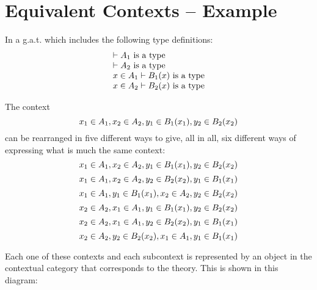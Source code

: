 \documentclass[10pt,a4paper]{scrartcl}
\begin{document}
\section{Equivalent Contexts -- Example}

In a g.a.t. \gat which includes the following type definitions:
\begin{displaymath}
\begin{array}{l}
\vdash A_1\mbox{ is a type} \\
\vdash A_2\mbox{ is a type} \\
x \in A_1\vdash B_1(x)\mbox{ is a type} \\
x \in A_2\vdash B_2(x)\mbox{ is a type} \\
\end{array}
\end{displaymath}

The context 
\begin{equation}
x_1 \in A_1,x_2 \in A_2,y_1 \in B_1(x_1),y_2 \in B_2(x_2)
\end{equation}
can be rearranged in five different ways to give, all in all, six different ways of expressing
what is much the same context:
\begin{equation}
x_1 \in A_1, x_2 \in A_2, y_1 \in B_1(x_1), y_2 \in B_2(x_2)
\end{equation}
\begin{equation}
x_1 \in A_1, x_2 \in A_2, y_2 \in B_2(x_2), y_1 \in B_1(x_1)
\end{equation}
\begin{equation}
x_1 \in A_1, y_1 \in B_1(x_1), x_2 \in A_2, y_2 \in B_2(x_2)
\end{equation}
\begin{equation}
x_2 \in A_2, x_1 \in A_1, y_1 \in B_1(x_1), y_2 \in B_2(x_2)
\end{equation}
\begin{equation}
x_2 \in A_2, x_1 \in A_1, y_2 \in B_2(x_2), y_1 \in B_1(x_1)
\end{equation}
\begin{equation}
x_2 \in A_2, y_2 \in B_2(x_2), x_1 \in A_1, y_1 \in B_1(x_1)
\end{equation}


Each one of these contexts and each subcontext is represented by an object
in the contextual category   that corresponds to the theory. This is
shown in this diagram:
\end{document}

